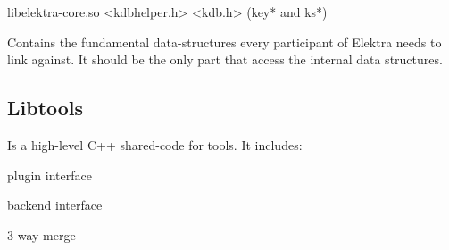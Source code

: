 \begin{DoxyVerb}libelektra-core.so
<kdbhelper.h>
<kdb.h> (key* and ks*)
\end{DoxyVerb}


Contains the fundamental data-\/structures every participant of Elektra needs to link against. It should be the only part that access the internal data structures.

\subsection*{Libtools}

Is a high-\/level C++ shared-\/code for tools. It includes\+:


\begin{DoxyItemize}
\item plugin interface
\item backend interface
\item 3-\/way merge 
\end{DoxyItemize}